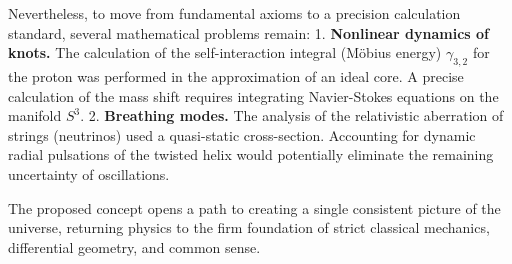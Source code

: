 \documentclass[11pt,a4paper]{article}
\begin{document}
	Nevertheless, to move from fundamental axioms to a precision calculation standard, several mathematical problems remain:
	1. \textbf{Nonlinear dynamics of knots.} The calculation of the self-interaction integral (Möbius energy) $\gamma_{3,2}$ for the proton was performed in the approximation of an ideal core. A precise calculation of the mass shift requires integrating Navier-Stokes equations on the manifold $S^3$.
	2. \textbf{Breathing modes.} The analysis of the relativistic aberration of strings (neutrinos) used a quasi-static cross-section. Accounting for dynamic radial pulsations of the twisted helix would potentially eliminate the remaining uncertainty of oscillations.
	
	The proposed concept opens a path to creating a single consistent picture of the universe, returning physics to the firm foundation of strict classical mechanics, differential geometry, and common sense.
	
\end{document}
